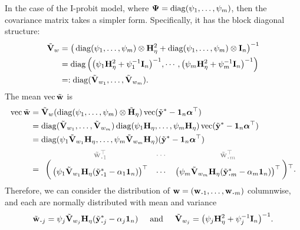 In the case of the I-probit model, where ${\bm\Psi} = \operatorname{diag}(\psi_1,\dots,\psi_m)$, then the covariance matrix takes a simpler form.
Specifically, it has the block diagonal structure:
\begin{align*}
  \tilde{{\mathbf V}}_w
  &=  \big( \operatorname{diag}(\psi_1,\dots,\psi_m) \otimes {\mathbf H}_\eta^2 + \operatorname{diag}(\psi_1,\dots,\psi_m) \otimes {\mathbf I}_n \big)^{-1} \\
  &= \operatorname{diag}\Big(
  \big( \psi_1{\mathbf H}_\eta^2 + \psi_1^{-1}{\mathbf I}_n\big)^{-1},
  \cdots,
  \big(\psi_m{\mathbf H}_\eta^2 + \psi_m^{-1}{\mathbf I}_n\big)^{-1}
  \Big) \\
  &=: \operatorname{diag}(\tilde{{\mathbf V}}_{w_1},\dots,\tilde{{\mathbf V}}_{w_m}).
  \end{align*}
The mean $\operatorname{vec} \tilde{{\mathbf w}}$ is
\begin{align*}
  \vecc \tilde\bw 
  &= \tilde\bV_w (\diag(\psi_1,\dots,\psi_m) \otimes \tilde\bH_\eta) \vecc(\tilde\by^* - \bone_n\balpha^\top) \\
  &= \diag(\tilde\bV_{w_1},\dots,\tilde\bV_{w_m})
  \diag(\psi_1\bH_\eta,\dots,\psi_m\bH_\eta)  
  \vecc(\tilde\by^* - \bone_n\balpha^\top) \\
  &= \diag(\psi_1\tilde\bV_{w_1}\bH_\eta,\dots,\psi_m\tilde\bV_{w_m}\bH_\eta)  
  (\tilde\by^* - \bone_n\balpha^\top) \\
  &= 
  \bordermatrix{
  &\color{gray}\tilde\bw_{\bigcdot 1}^\top 
  &\color{gray}\cdots 
  &\color{gray}\tilde\bw_{\bigcdot m}^\top \cr
  &\big(\psi_1\tilde\bV_{w_{1}}\bH_\eta(\tilde\by^*_{\bigcdot 1} - \alpha_1\bone_n)\big)^\top
  &\cdots 
  &\big(\psi_m\tilde\bV_{w_{m}}\bH_\eta(\tilde\by^*_{\bigcdot m} - \alpha_m\bone_n)\big)^\top
  }{}^\top.
\end{align*}
Therefore, we can consider the distribution of $\bw = (\bw_{\bigcdot 1},\dots,\bw_{\bigcdot m})$ columnwise, and each are normally distributed with mean and variance
\[
  \tilde\bw_{\bigcdot j} = \psi_j\tilde\bV_{w_{j}}\bH_\eta(\tilde\by^*_{\bigcdot j} - \alpha_j\bone_n)
  \hspace{0.5cm}\text{and}\hspace{0.5cm}
  \tilde\bV_{w_{j}} = \big( \psi_j\bH_\eta^2 + \psi_j^{-1}\bI_n\big)^{-1}.
\]

